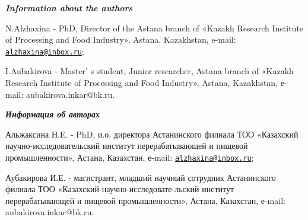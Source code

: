 \begin{authorinfo}
\hspace{1em}\emph{{\bfseries Information about the authors}}

N.Alzhaxina - PhD, Director of the Astana branch of «Kazakh Research
Institute of Processing and Food Industry», Astana, Kazakhstan, e-mail:
\href{mailto:alzhaxina@inbox.ru}{\nolinkurl{alzhaxina@inbox.ru}};

I.Aubakirova - Master' s student, Junior researcher,
Astana branch of «Kazakh Research Institute of Processing and Food
Industry», Astana, Kazakhstan, е-mail: aubakirova.inkar@bk.ru.

\hspace{1em}\emph{{\bfseries Информация об авторах}}

Альжаксина Н.E. - PhD, и.о. директора Астанинского филиала ТОО
«Казахский научно-исследовательский институт перерабатывающей и пищевой
промышленности», Астана, Казахстан, е-mail:
\href{mailto:alzhaxina@inbox.ru}{\nolinkurl{alzhaxina@inbox.ru}};

Аубакирова И.Е. - магистрант, младший научный сотрудник Астанинского
филиала ТОО «Казахский научно-исследовате-льский институт
перерабатывающей и пищевой промышленности», Астана, Казахстан, е-mail:
aubakirova.inkar@bk.ru.
\end{authorinfo}
